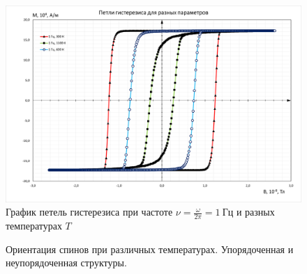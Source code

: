 \documentclass[oneside,final,14pt]{extarticle}
\begin{document}
\begin{figure}[h]
\centering
\includegraphics{fig1edit.png}
\caption{График петель гистерезиса при частоте $\nu=\frac{\omega}{2\pi}=1 \ \text{Гц}$ и разных температурах $T$}
\label{ris:hyst1}
\end{figure}
\begin{figure}[h]
\centering
{}
\qquad
{}
\caption{Ориентация спинов при различных температурах. Упорядоченная и неупорядоченная структуры.}
\label{ris:orient}
\end{figure}
\end{document}
